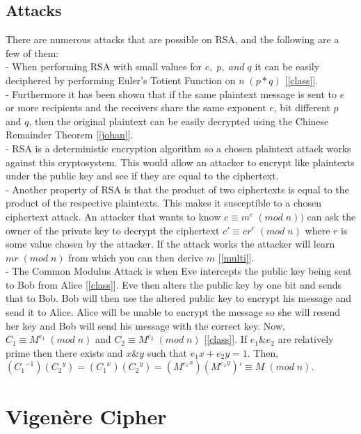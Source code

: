 \documentclass[12pt]{article}
\begin{document}
\subsection{Attacks}
There are numerous attacks that are possible on RSA, and the following are a few of them:\\
- When performing RSA with small values for $e,\;p,\;and\;q$ it can be easily deciphered by performing Euler's Totient Function on $n\;(p*q)$ [\ref{class}].\\
- Furthermore it has been shown that if the same plaintext message is sent to $e$ or more recipients and the receivers share the same exponent $e$, bit different $p$ and $q$, then the original plaintext can be easily decrypted using the Chinese Remainder Theorem [\ref{johan}].\\
- RSA is a deterministic encryption algorithm so a chosen plaintext attack works against this cryptosystem. This would allow an attacker to encrypt like plaintexts under the public key and see if they are equal to the ciphertext.\\
- Another property of RSA is that the product of two ciphertexts is equal to the product of the respective plaintexts. This makes it susceptible to a chosen ciphertext attack. An attacker that wants to know $c\equiv m^e\;(mod\;n))$ can ask the owner of the private key to decrypt the ciphertext $c'\equiv cr^e\;(mod\;n)$ where $r$ is some value chosen by the attacker. If the attack works the attacker will learn $mr\;(mod\;n)$ from which you can then derive $m$ [\ref{multi}].\\
- The Common Modulus Attack is when Eve intercepts the public key being sent to Bob from Alice [\ref{class}]. Eve then alters the public key by one bit and sends that to Bob. Bob will then use the altered public key to encrypt his message and send it to Alice. Alice will be unable to encrypt the message so she will resend her key and Bob will send his message with the correct key. Now, $C_1\equiv M^{e_1}\;(mod\;n)$ and $C_2\equiv M^{e_2}\;(mod\;n)$ [\ref{class}]. If $e_1 \&e_2$ are relatively prime then there exists and $x\& y$ such that $e_1x+e_2y=1$. Then, $({C_1}^{-1})({C_2}^{y})=({C_1}^{x})({C_2}^{y})=({M^{e_1}}^{x})({M^{e_2}}^{y})'\equiv M\;(mod\;n)$.

\section{Vigen\`ere Cipher}
\end{document}
